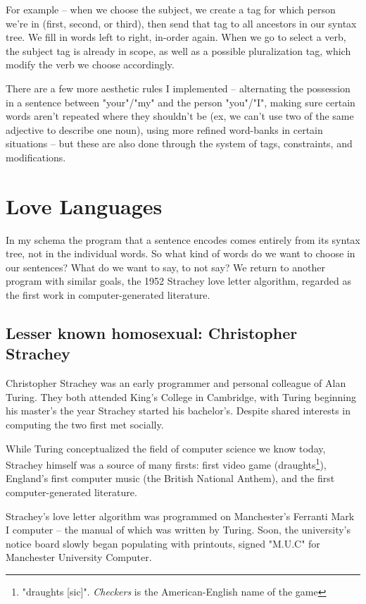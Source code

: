 \documentclass[runningheads]{llncs}
\begin{document}
For example -- when we choose the subject, we create a tag for which person we're in (first, second, or third), then send that tag to all ancestors in our syntax tree. We fill in words left to right, in-order again. When we go to select a verb, the subject tag is already in scope, as well as a possible pluralization tag, which modify the verb we choose accordingly.

There are a few more aesthetic rules I implemented -- alternating the possession in a sentence between "your"/"my" and the person "you"/"I", making sure certain words aren't repeated where they shouldn't be (ex, we can't use two of the same adjective to describe one noun), using more refined word-banks in certain situations -- but these are also done through the system of tags, constraints, and modifications.
\section{Love Languages}
In my schema the program that a sentence encodes comes entirely from its syntax tree, not in the individual words. So what kind of words do we want to choose in our sentences? What do we want to say, to not say? We return to another program with similar goals, the 1952 Strachey love letter algorithm, regarded as the first work in computer-generated literature. \cite{gaboury2013}

\subsection{Lesser known homosexual: Christopher Strachey}
Christopher Strachey was an early programmer and personal colleague of Alan Turing. They both attended King's College in Cambridge, with Turing beginning his master's the year Strachey started his bachelor's. Despite shared interests in computing the two first met socially.

While Turing conceptualized the field of computer science we know today, Strachey himself was a source of many firsts: first video game (draughts\footnote{"draughts [sic]". \textit{Checkers} is the American-English name of the game}), England's first computer music (the British National Anthem), and the first computer-generated literature.

Strachey's love letter algorithm was programmed on Manchester's Ferranti Mark I computer -- the manual of which was written by Turing. Soon, the university's notice board slowly began populating with printouts, signed "M.U.C" for Manchester University Computer.
\end{document}
